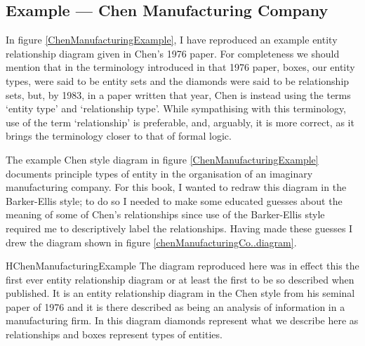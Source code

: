 \subsection{Example --- Chen Manufacturing Company}
\label{ChenManufacturingCompany}
In figure \ref{ChenManufacturingExample}, I have reproduced an example entity relationship diagram  given in Chen's 1976 paper. 
For completeness we should mention that in the terminology introduced in that 1976 paper, boxes, our entity types, were said to be entity sets and the diamonds were said to be relationship sets, but, by 1983, in a paper written that year, Chen is instead using the terms `entity type' and `relationship type'. While sympathising with this terminology, use of the term `relationship' is preferable, and, arguably, it is more correct, as it brings the terminology closer to that of formal logic.

\mynote
The example Chen style diagram in figure \ref{ChenManufacturingExample} documents principle types of entity in the organisation of an imaginary manufacturing company.  For this book, I wanted to redraw
this diagram in the Barker-Ellis style; to do so I needed to make some educated guesses about the meaning of some of Chen's relationships since use of the Barker-Ellis style  required me to descriptively label the relationships. Having made these guesses I drew the diagram shown
 in figure \ref{chenManufacturingCo..diagram}. 

\begin{erboxedFigure} {H}{ChenManufacturingExample}{
The diagram reproduced here was in effect this the first ever entity relationship diagram or at least the first to be so described when published. 
It is an entity relationship diagram in the Chen style from his seminal paper of 1976 and it is there described as being an analysis of information in a manufacturing firm. In this diagram
diamonds represent what we describe here as relationships and boxes represent types of entities.  
}
\begin{center}
\scalebox{0.80}{}
\end{center}
\end{erboxedFigure}

